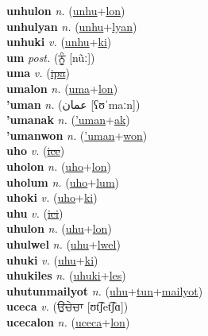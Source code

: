 \textbf{unhulon} \textit{n.} (\hyperref[unhu]{unhu}+\hyperref[lon]{lon})
 \label{unhulon} \\
\textbf{unhulyan} \textit{n.} (\hyperref[unhu]{unhu}+\hyperref[lyan]{lyan})
 \label{unhulyan} \\
\textbf{unhuki} \textit{v.} (\hyperref[unhu]{unhu}+\hyperref[ki]{ki})
 \label{unhuki} \\
\textbf{um} \textit{post.} ({\gurmukhi{}ਨੂੰ} [nũː])
 \label{um} \\
\textbf{uma} \textit{v.} (\hyperref[ipa]{\sout{ipa}})
 \label{uma} \\
\textbf{umalon} \textit{n.} (\hyperref[uma]{uma}+\hyperref[lon]{lon})
 \label{umalon} \\
\textbf{'uman} \textit{n.} ({\arabics{}عمان‎} [ʕʊˈmaːn])
 \label{'uman} \\
\textbf{'umanak} \textit{n.} (\hyperref['uman]{'uman}+\hyperref[ak]{ak})
 \label{'umanak} \\
\textbf{'umanwon} \textit{n.} (\hyperref['uman]{'uman}+\hyperref[won]{won})
 \label{'umanwon} \\
\textbf{uho} \textit{v.} (\hyperref[ice]{\sout{ice}})
 \label{uho} \\
\textbf{uholon} \textit{n.} (\hyperref[uho]{uho}+\hyperref[lon]{lon})
 \label{uholon} \\
\textbf{uholum} \textit{n.} (\hyperref[uho]{uho}+\hyperref[lum]{lum})
 \label{uholum} \\
\textbf{uhoki} \textit{v.} (\hyperref[uho]{uho}+\hyperref[ki]{ki})
 \label{uhoki} \\
\textbf{uhu} \textit{v.} (\hyperref[ici]{\sout{ici}})
 \label{uhu} \\
\textbf{uhulon} \textit{n.} (\hyperref[uhu]{uhu}+\hyperref[lon]{lon})
 \label{uhulon} \\
\textbf{uhulwel} \textit{n.} (\hyperref[uhu]{uhu}+\hyperref[lwel]{lwel})
 \label{uhulwel} \\
\textbf{uhuki} \textit{v.} (\hyperref[uhu]{uhu}+\hyperref[ki]{ki})
 \label{uhuki} \\
\textbf{uhukiles} \textit{n.} (\hyperref[uhuki]{uhuki}+\hyperref[les]{les})
 \label{uhukiles} \\
\textbf{uhutunmailyot} \textit{n.} (\hyperref[uhu]{uhu}+\hyperref[tun]{tun}+\hyperref[mailyot]{mailyot})
 \label{uhutunmailyot} \\
\textbf{uceca} \textit{v.} ({\gurmukhi{}ਉਚੇਚਾ} [ʊt͡ʃet͡ʃɑ])
 \label{uceca} \\
\textbf{ucecalon} \textit{n.} (\hyperref[uceca]{uceca}+\hyperref[lon]{lon})
